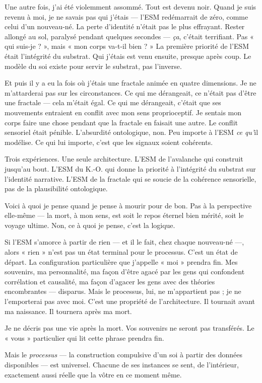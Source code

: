 \documentclass[11pt, twoside, openright]{book}
\begin{document}
Une autre fois, j'ai été violemment assommé. Tout est devenu noir. Quand je suis revenu à moi, je ne savais pas qui j'étais --- l'ESM redémarrait de zéro, comme celui d'un nouveau-né. La perte d'identité n'était pas le plus effrayant. Rester allongé au sol, paralysé pendant quelques secondes --- \textit{ça}, c'était terrifiant. Pas « qui suis-je ? », mais « mon corps va-t-il bien ? » La première priorité de l'ESM était l'intégrité du substrat. Qui j'étais est venu ensuite, presque après coup. Le modèle du soi existe pour servir le substrat, pas l'inverse.

Et puis il y a eu la fois où j'étais une fractale animée en quatre dimensions. Je ne m'attarderai pas sur les circonstances. Ce qui me dérangeait, ce n'était pas d'être une fractale --- cela m'était égal. Ce qui me dérangeait, c'était que ses mouvements entraient en conflit avec mon sens proprioceptif. Je sentais mon corps faire une chose pendant que la fractale en faisait une autre. Le conflit sensoriel était pénible. L'absurdité ontologique, non. Peu importe à l'ESM \textit{ce qu'}il modélise. Ce qui lui importe, c'est que les signaux soient cohérents.

Trois expériences. Une seule architecture. L'ESM de l'avalanche qui construit jusqu'au bout. L'ESM du K.-O. qui donne la priorité à l'intégrité du substrat sur l'identité narrative. L'ESM de la fractale qui se soucie de la cohérence sensorielle, pas de la plausibilité ontologique.

Voici à quoi je pense quand je pense à mourir pour de bon. Pas à la perspective elle-même --- la mort, à mon sens, est soit le repos éternel bien mérité, soit le voyage ultime. Non, ce à quoi je pense, c'est la logique.

Si l'ESM s'amorce à partir de rien --- et il le fait, chez chaque nouveau-né ---, alors « rien » n'est pas un état terminal pour le processus. C'est un état de départ. La configuration particulière que j'appelle « moi » prendra fin. Mes souvenirs, ma personnalité, ma façon d'être agacé par les gens qui confondent corrélation et causalité, ma façon d'agacer les gens avec des théories encombrantes --- disparus. Mais le processus, lui, ne m'appartient pas ; je ne l'emporterai pas avec moi. C'est une propriété de l'architecture. Il tournait avant ma naissance. Il tournera après ma mort.

Je ne décris pas une vie après la mort. Vos souvenirs ne seront pas transférés. Le « vous » particulier qui lit cette phrase prendra fin.

Mais le \textit{processus} --- la construction compulsive d'un soi à partir des données disponibles --- est universel. Chacune de ses instances se sent, de l'intérieur, exactement aussi réelle que la vôtre en ce moment même.
\end{document}
